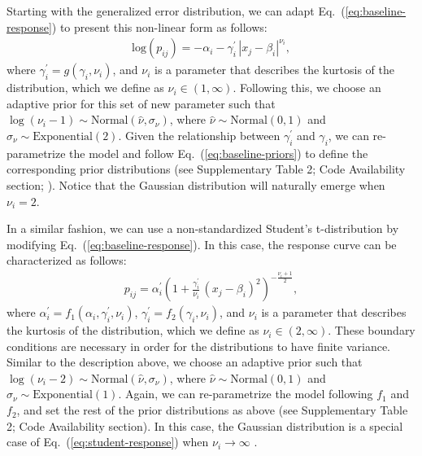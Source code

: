 \documentclass[11pt, a4paper]{article}
\begin{document}
Starting with the generalized error distribution, we can adapt Eq.~(\ref{eq:baseline-response}) to present this non-linear form as follows:
\begin{equation}
\begin{split}
\text{log}\left(p_{ij}\right) = -\alpha_{i} - \gamma^{\prime}_{i}\, |x_{j}-\beta_{i}|^{\nu_{i}} ,
\end{split}
\label{eq:generalized-response}
\end{equation}
where $\gamma^{\prime}_{i} = g(\gamma_{i}, \nu_{i})$, and $\nu_{i}$ is a parameter that describes the kurtosis of the distribution, which we define as $\nu_{i}\in\left(1, \infty\right)$. Following this, we choose an adaptive prior for this set of new parameter such that $\log\left(\nu_{i}-1\right)\sim \text{Normal}\left(\hat{\nu}, \sigma_{\nu}\right)$, where $\hat{\nu}\sim\text{Normal}\left(0, 1\right)$ and $\sigma_{\nu}\sim\text{Exponential}\left(2\right)$. Given the relationship between $\gamma^{\prime}_{i}$ and $\gamma_{i}$,  we can re-parametrize the model and follow Eq.~(\ref{eq:baseline-priors}) to define the corresponding prior distributions (see Supplementary Table 2; Code Availability section; \citealt{stats book}). Notice that the Gaussian distribution will naturally emerge when $\nu_i=2$.

In a similar fashion, we can use a non-standardized Student's t-distribution by modifying Eq.~(\ref{eq:baseline-response}). In this case, the response curve can be characterized as follows:
\begin{equation}
\begin{split}
p_{ij}  =  \alpha^{\prime}_{i}\left(1+\frac{\gamma^{\prime}_{i}}{\nu_{i}}\, \left(x_{j}-\beta_{i}\right)^2\right)^{-\frac{\nu_{i}+1}{2}},
\end{split}
\label{eq:student-response}
\end{equation}
where $\alpha^{\prime}_{i} = f_{1}\left(\alpha_{i}, \gamma^{\prime}_{i}, \nu_{i}\right)$, $\gamma^{\prime}_{i} = f_{2}\left(\gamma_{i}, \nu_{i}\right)$, and $\nu_{i}$ is a parameter that describes the kurtosis of the distribution, which we define as $\nu_{i}\in\left(2, \infty\right)$. These boundary conditions are necessary in order for the distributions to have finite variance. Similar to the description above, we choose an adaptive prior such that $\log\left(\nu_{i}-2\right)\sim \text{Normal}\left(\hat{\nu}, \sigma_{\nu}\right)$, where $\hat{\nu}\sim\text{Normal}\left(0, 1\right)$ and $\sigma_{\nu}\sim\text{Exponential}\left(1\right)$. Again, we can re-parametrize the model following $f_1$ and $f_2$, and set the rest of the prior distributions as above (see Supplementary Table 2; Code Availability section). In this case, the Gaussian distribution is a special case of Eq.~(\ref{eq:student-response}) when $\nu_i\to\infty$ \citep{stats book}.
\end{document}
